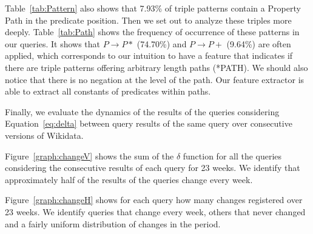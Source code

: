 \documentclass[runningheads]{llncs}
\begin{document}
Table~\ref{tab:Pattern} also shows that 7.93\% of triple patterns contain a Property Path in the predicate position. Then we set out to analyze these triples more deeply. Table~\ref{tab:Path} shows the frequency of occurrence of these patterns in our queries. It shows that $ P \rightarrow P * $ (74.70\%) and $ P \rightarrow P + $ (9.64\%) are often applied, which corresponds to our intuition to have a feature that indicates if there are triple patterns offering arbitrary length paths (*PATH). We should also notice that there is no negation at the level of the path. Our feature extractor is able to extract all constants of predicates within paths.

Finally, we evaluate the dynamics of the results of the queries considering Equation~\ref{eq:delta} between query results of the same query over consecutive versions of Wikidata.

Figure~\ref{graph:changeV} shows the sum of the $ \delta $ function for all the queries considering the consecutive results of each query for 23 weeks. We identify that approximately half of the results of the queries change every week.

Figure~\ref{graph:changeH} shows for each query how many changes registered over 23 weeks. We identify queries that change every week, others that never changed and a fairly uniform distribution of changes in the period.
\end{document}
